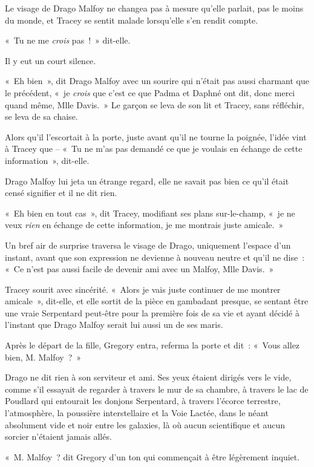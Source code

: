 Le visage de Drago Malfoy ne changea pas à mesure qu'elle parlait, pas le moins du monde, et Tracey se sentit malade lorsqu'elle s'en rendit compte.

«~Tu ne me \emph{crois} pas~!~»
dit-elle.

Il y eut un court silence.

«~Eh bien~», dit Drago Malfoy avec un sourire qui n'était pas aussi charmant que le précédent, «~je \emph{crois} que c'est ce que Padma et Daphné ont dit, donc merci quand même, Mlle Davis.~»
Le garçon se leva de son lit et Tracey, sans réfléchir, se leva de sa chaise.

Alors qu'il l'escortait à la porte, juste avant qu'il ne tourne la poignée, l'idée vint à Tracey que -- «~Tu ne m'as pas demandé ce que je voulais en échange de cette information~», dit-elle.

Drago Malfoy lui jeta un étrange regard, elle ne savait pas bien ce qu'il était censé signifier et il ne dit rien.

«~Eh bien en tout cas~», dit Tracey, modifiant ses plans sur-le-champ, «~je ne veux \emph{rien} en échange de cette information, je me montrais juste amicale.~»

Un bref air de surprise traversa le visage de Drago, uniquement l'espace d'un instant, avant que son expression ne devienne à nouveau neutre et qu'il ne dise~: «~Ce n'est pas aussi facile de devenir ami avec un Malfoy, Mlle Davis.~»

Tracey sourit avec sincérité.
«~Alors je vais juste continuer de me montrer amicale~», dit-elle, et elle sortit de la pièce en gambadant presque, se sentant être une vraie Serpentard peut-être pour la première fois de sa vie et ayant décidé à l'instant que Drago Malfoy serait lui aussi un de ses maris.

\later

Après le départ de la fille, Gregory entra, referma la porte et dit~: «~Vous allez bien, M. Malfoy~?~»

Drago ne dit rien à son serviteur et ami.
Ses yeux étaient dirigés vers le vide, comme s'il essayait de regarder à travers le mur de sa chambre, à travers le lac de Poudlard qui entourait les donjons Serpentard, à travers l'écorce terrestre, l'atmosphère, la poussière interstellaire et la Voie Lactée, dans le néant absolument vide et noir entre les galaxies, là où aucun scientifique et aucun sorcier n'étaient jamais allés.

«~M. Malfoy~? dit Gregory d'un ton qui commençait à être légèrement inquiet.

